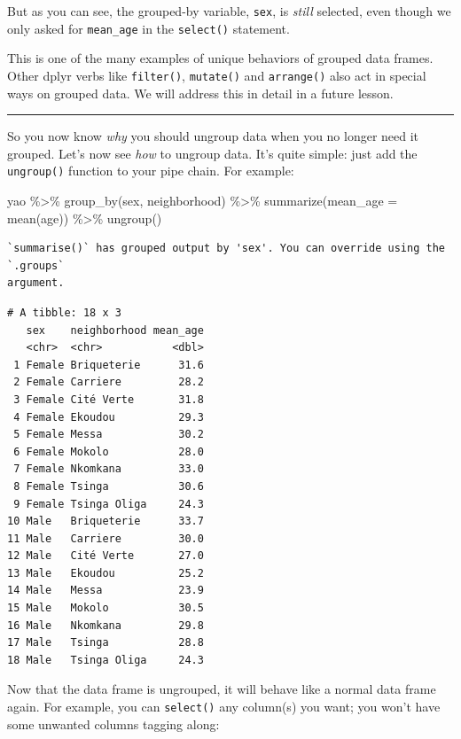\documentclass[
  letterpaper,
  DIV=11,
  numbers=noendperiod]{scrreprt}
\newenvironment{Shaded}{\begin{snugshade}}{\end{snugshade}}
\newcommand{\AttributeTok}[1]{\textcolor[rgb]{0.40,0.45,0.13}{#1}}
\newcommand{\FunctionTok}[1]{\textcolor[rgb]{0.28,0.35,0.67}{#1}}
\newcommand{\NormalTok}[1]{\textcolor[rgb]{0.00,0.23,0.31}{#1}}
\newcommand{\SpecialCharTok}[1]{\textcolor[rgb]{0.37,0.37,0.37}{#1}}
\begin{document}
But as you can see, the grouped-by variable, \texttt{sex}, is
\emph{still} selected, even though we only asked for \texttt{mean\_age}
in the \texttt{select()} statement.

This is one of the many examples of unique behaviors of grouped data
frames. Other dplyr verbs like \texttt{filter()}, \texttt{mutate()} and
\texttt{arrange()} also act in special ways on grouped data. We will
address this in detail in a future lesson.

\begin{center}\rule{0.5\linewidth}{0.5pt}\end{center}

So you now know \emph{why} you should ungroup data when you no longer
need it grouped. Let's now see \emph{how} to ungroup data. It's quite
simple: just add the \texttt{ungroup()} function to your pipe chain. For
example:

\begin{Shaded}
\begin{Highlighting}[]
\NormalTok{yao }\SpecialCharTok{\%\textgreater{}\%} 
  \FunctionTok{group\_by}\NormalTok{(sex, neighborhood) }\SpecialCharTok{\%\textgreater{}\%} 
  \FunctionTok{summarize}\NormalTok{(}\AttributeTok{mean\_age =} \FunctionTok{mean}\NormalTok{(age)) }\SpecialCharTok{\%\textgreater{}\%} 
  \FunctionTok{ungroup}\NormalTok{()}
\end{Highlighting}
\end{Shaded}

\begin{verbatim}
`summarise()` has grouped output by 'sex'. You can override using the `.groups`
argument.
\end{verbatim}

\begin{verbatim}
# A tibble: 18 x 3
   sex    neighborhood mean_age
   <chr>  <chr>           <dbl>
 1 Female Briqueterie      31.6
 2 Female Carriere         28.2
 3 Female Cité Verte       31.8
 4 Female Ekoudou          29.3
 5 Female Messa            30.2
 6 Female Mokolo           28.0
 7 Female Nkomkana         33.0
 8 Female Tsinga           30.6
 9 Female Tsinga Oliga     24.3
10 Male   Briqueterie      33.7
11 Male   Carriere         30.0
12 Male   Cité Verte       27.0
13 Male   Ekoudou          25.2
14 Male   Messa            23.9
15 Male   Mokolo           30.5
16 Male   Nkomkana         29.8
17 Male   Tsinga           28.8
18 Male   Tsinga Oliga     24.3
\end{verbatim}

Now that the data frame is ungrouped, it will behave like a normal data
frame again. For example, you can \texttt{select()} any column(s) you
want; you won't have some unwanted columns tagging along:
\end{document}
